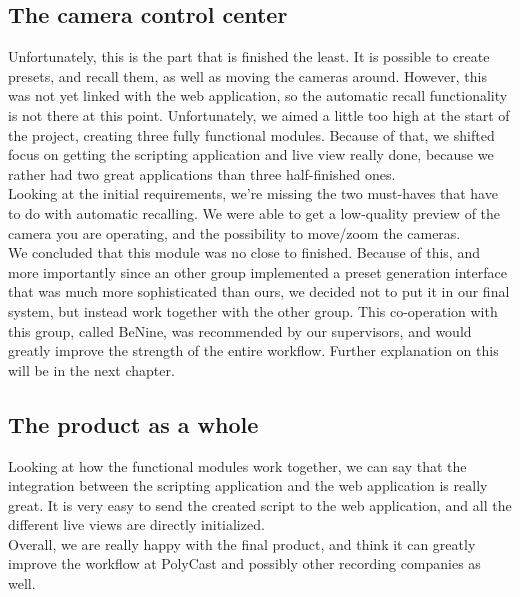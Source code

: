 \subsection{The camera control center}
Unfortunately, this is the part that is finished the least. It is possible to create presets, and recall them, as well as moving the cameras around. However, this was not yet linked with the web application, so the automatic recall functionality is not there at this point. Unfortunately, we aimed a little too high at the start of the project, creating three fully functional modules. Because of that, we shifted focus on getting the scripting application and live view really done, because we rather had two great applications than three half-finished ones.\\
Looking at the initial requirements, we're missing the two must-haves that have to do with automatic recalling. We were able to get a low-quality preview of the camera you are operating, and the possibility to move/zoom the cameras.\\
We concluded that this module was no close to finished. Because of this, and more importantly since an other group implemented a preset generation interface that was much more sophisticated than ours, we decided not to put it in our final system, but instead work together with the other group. This co-operation with this group, called BeNine, was recommended by our supervisors, and would greatly improve the strength of the entire workflow. Further explanation on this will be in the next chapter.

\subsection*{The product as a whole}
Looking at how the functional modules work together, we can say that the integration between the scripting application and the web application is really great. It is very easy to send the created script to the web application, and all the different live views are directly initialized.\\
Overall, we are really happy with the final product, and think it can greatly improve the workflow at PolyCast and possibly other recording companies as well.